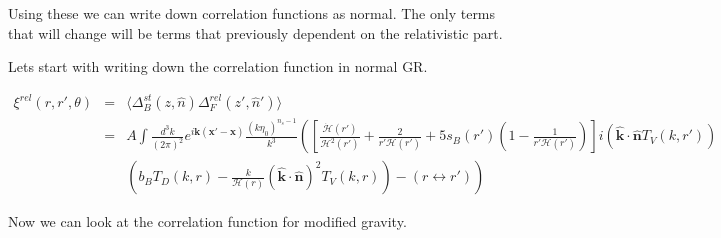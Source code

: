 \documentclass[aps,showpacs,onecolumn,floats,prd,superscriptaddress,nofootinbib]{revtex4-1}
\begin{document}
Using these we can write down correlation functions as normal. 
The only terms that will change will be terms that previously dependent on the relativistic part. 

Lets start with writing down the correlation function in normal GR. 

\begin{eqnarray}
	\xi^{rel}(r,r',\theta) & = & \langle \Delta^{st}_B(z,\hat{n}) \Delta^{rel}_F(z',\hat{n}')\rangle \nonumber	\\
	&= & A \int \frac{d^3k}{(2 \pi)^2} e^{i\textbf{k}(\textbf{x}' - \textbf{x})} \frac{(k\eta_0)^{n_s-1}}{k^3} \left( \left[ \frac{\dot{\mathcal{H}}(r')}{\mathcal{H}^2(r')} + \frac{2}{r' \mathcal{H}(r')} + 5 s_B(r') \left(1 - \frac{1}{r'\mathcal{H}(r')} \right) \right] i (\hat{\textbf{k}} \cdot \hat{\textbf{n}} T_V(k,r'))	 \right.\nonumber \\
	& & \left. \left(b_BT_D(k,r) - \frac{k}{\mathcal{H}(r)} (\hat{\textbf{k}} \cdot \hat{\textbf{n}})^2 T_V(k,r)\right) - (r \leftrightarrow r') \right)
\end{eqnarray}

Now we can look at the correlation function for modified gravity. 
\end{document}
